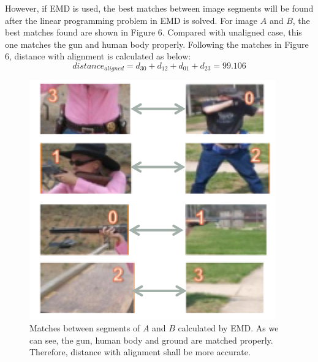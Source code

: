 \noindent However, if EMD is used, the best matches between image segments will be found after the linear programming problem in EMD is solved. For image $A$ and $B$, the best matches found are shown in Figure 6. Compared with unaligned case, this one matches the gun and human body properly. Following the matches in Figure 6, distance with alignment is calculated as below: $$distance_{aligned} = d_{30} + d_{12} + d_{01} + d_{23} = 99.106$$

\begin{figure}[!ht]
\centering
	\includegraphics[scale = 1]{./image_EMD.png}
\caption{Matches between segments of $A$ and $B$ calculated by EMD. As we can see, the gun, human body and ground are matched properly. Therefore, distance with alignment shall be more accurate.}
\end{figure}

